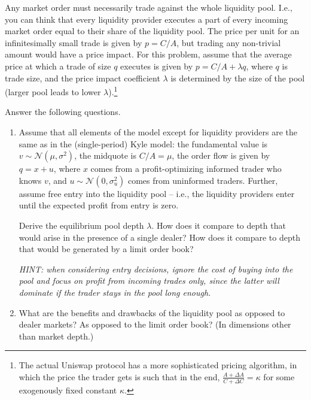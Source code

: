 	Any market order must necessarily trade against the whole liquidity pool. I.e., you can think that every liquidity provider executes a part of every incoming market order equal to their share of the liquidity pool. The price per unit for an infinitesimally small trade is given by $p=C/A$, but trading any non-trivial amount would have a price impact. For this problem, assume that the average price at which a trade of size $q$ executes is given by $p = C/A + \lambda q$, where $q$ is trade size, and the price impact coefficient $\lambda$ is determined by the size of the pool (larger pool leads to lower $\lambda$).\footnote{The actual Uniswap protocol has a more sophisticated pricing algorithm, in which the price the trader gets is such that in the end, $\frac{A+\varDelta A}{C+\varDelta C} = \kappa$ for some exogenously fixed constant $\kappa$.}
	
	Answer the following questions.
	\begin{enumerate}
		\item Assume that all elements of the model except for liquidity providers are the same as in the (single-period) Kyle model: the fundamental value is $v \sim \mathcal{N}(\mu,\sigma^2)$, the midquote is $C/A=\mu$, the order flow is given by $q=x+u$, where $x$ comes from a profit-optimizing informed trader who knows $v$, and $u \sim \mathcal{N}(0,\sigma^2_u)$ comes from uninformed traders. Further, assume free entry into the liquidity pool -- i.e., the liquidity providers enter until the expected profit from entry is zero. 
		
		Derive the equilibrium pool depth $\lambda$. How does it compare to depth that would arise in the presence of a single dealer? How does it compare to depth that would be generated by a limit order book?
		
		\emph{HINT: when considering entry decisions, ignore the cost of buying into the pool and focus on profit from incoming trades only, since the latter will dominate if the trader stays in the pool long enough.}
		
		\item What are the benefits and drawbacks of the liquidity pool as opposed to dealer markets? As opposed to the limit order book? (In dimensions other than market depth.)
	\end{enumerate}


